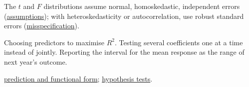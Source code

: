 \begin{qfmethod}
 The $t$ and $F$ distributions assume normal, homoskedastic, independent errors (\hyperref[meth:regression-diagnostics-anova]{assumptions}); with heteroskedasticity or autocorrelation, use robust standard errors (\hyperref[meth:regression-misspecification]{misspecification}).

 Choosing predictors to maximise $R^2$. Testing several coefficients one at a time instead of jointly. Reporting the interval for the mean response as the range of next year's outcome.

 \hyperref[meth:regression-prediction-functional-form]{prediction and functional form}; \hyperref[meth:hypothesis-testing]{hypothesis tests}.

\end{qfmethod}

